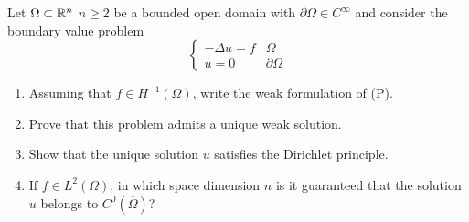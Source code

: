 \newpage
\begin{exercise}
    Let \(\Omega \subset \mathbb{R}^n\) \(n \geq 2\) be a bounded open domain with \(\partial\Omega \in C^\infty\) and consider the boundary value problem
    \[
        \begin{cases}
            -\Delta u = f & \Omega \\
            u = 0 & \partial\Omega
        \end{cases}
        \tag*{(P)}
    \]
    \begin{enumerate}
        \item Assuming that \(f \in H^{-1}(\Omega)\), write the weak formulation of (P).
        \item Prove that this problem admits a unique weak solution.
        \item Show that the unique solution \(u\) satisfies the Dirichlet principle.
        \item If \(f \in L^2(\Omega)\), in which space dimension \(n\) is it guaranteed that the solution \(u\) belongs to \(C^0(\overline{\Omega})\)?
    \end{enumerate}
\end{exercise}
